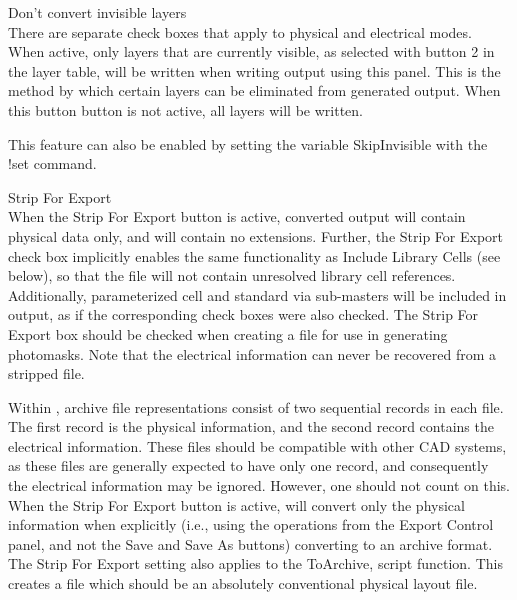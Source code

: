 \begin{description}
\item{\cb Don't convert invisible layers}\\
There are separate check boxes that apply to physical and electrical
modes.  When active, only layers that are currently visible, as
selected with button 2 in the layer table, will be written when
writing output using this panel.  This is the method by which certain
layers can be eliminated from generated output.  When this button
button is not active, all {\Xic} layers will be written.

This feature can also be enabled by setting the variable {\et
SkipInvisible} with the {\cb !set} command.

\item{\cb Strip For Export}\\
When the {\cb Strip For Export} button is active, converted output
will contain physical data only, and will contain no {\Xic}
extensions.  Further, the {\cb Strip For Export} check box implicitly
enables the same functionality as {\cb Include Library Cells} (see
below), so that the file will not contain unresolved library cell
references.  Additionally, parameterized cell and standard via
sub-masters will be included in output, as if the corresponding check
boxes were also checked.  The {\cb Strip For Export} box should be
checked when creating a file for use in generating photomasks.  Note
that the electrical information can never be recovered from a stripped
file.

Within {\Xic}, archive file representations consist of two sequential
records in each file.  The first record is the physical information,
and the second record contains the electrical information.  These
files should be compatible with other CAD systems, as these files are
generally expected to have only one record, and consequently the
electrical information may be ignored.  However, one should not count
on this.  When the {\cb Strip For Export} button is active, {\Xic}
will convert only the physical information when explicitly (i.e.,
using the operations from the {\cb Export Control} panel, and not
the {\cb Save} and {\cb Save As} buttons) converting to an archive
format.  The {\cb Strip For Export} setting also applies to the {\vt
ToArchive}, script function.  This creates a file which should be an
absolutely conventional physical layout file.


\end{description}
